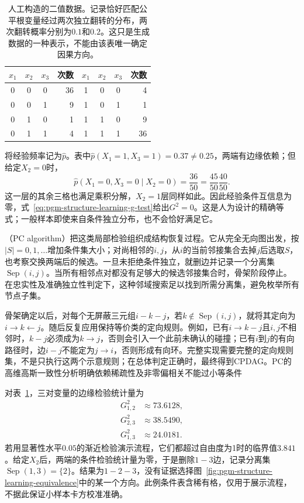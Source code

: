 \begin{table}[htbp]
  \centering
  \begin{tabular}{ccc r@{\qquad}ccc r}
    \toprule
    $x_1$ & $x_2$ & $x_3$ & 次数 & $x_1$ & $x_2$ & $x_3$ & 次数 \\
    \midrule
    0 & 0 & 0 & 36 & 1 & 0 & 0 & 4 \\
    0 & 0 & 1 & 9  & 1 & 0 & 1 & 1 \\
    0 & 1 & 0 & 1  & 1 & 1 & 0 & 9 \\
    0 & 1 & 1 & 4  & 1 & 1 & 1 & 36 \\
    \bottomrule
  \end{tabular}
  \caption{人工构造的二值数据。记录恰好匹配公平根变量经过两次独立翻转的分布，两次翻转概率分别为$0.1$和$0.2$。这只是生成数据的一种表示，不能由该表唯一确定因果方向。}
  \label{tab:pgm-structure-learning-counts}
\end{table}

将经验频率记为$\widehat p$。表中$\widehat p(X_1=1,X_3=1)=0.37\ne0.25$，两端有边缘依赖；但给定$X_2=0$时，
\[
  \widehat p(X_1=0,X_3=0\mid X_2=0)
  =\frac{36}{50}=\frac{45}{50}\frac{40}{50}.
\]
这一层的其余三格也满足乘积分解，$X_2=1$层同样如此。因此经验条件互信息为零，式~\eqref{eq:pgm-structure-learning-g-test}给出$G^2=0$。这是人为设计的精确等式；一般样本即使来自条件独立分布，也不会恰好满足它。

（PC algorithm）把这类局部检验组织成结构恢复过程。它从完全无向图出发，按$|S|=0,1,\ldots$增加条件集大小；对尚相邻的$i,j$，从$i$的当前邻接集合去掉$j$后选取$S$，也考察交换两端后的候选。一旦未拒绝条件独立，就删边并记录一个分离集$\operatorname{Sep}(i,j)$。当所有相邻点对都没有足够大的候选邻接集合时，骨架阶段停止。在忠实性及准确独立性判定下，这种邻域搜索足以找到所需分离集，避免枚举所有节点子集。

骨架确定以后，对每个无屏蔽三元组$i-k-j$，若$k\notin\operatorname{Sep}(i,j)$，就将其定向为$i\to k\leftarrow j$。随后反复应用保持等价类的定向规则。例如，已有$i\to k-j$且$i,j$不相邻时，$k-j$必须成为$k\to j$，否则会引入一个此前未确认的碰撞；已有$i$到$j$的有向路径时，边$i-j$不能定为$j\to i$，否则形成有向环。完整实现需要完整的定向规则集，不是只执行这两个示意规则；在总体判定正确时，最终得到CPDAG。PC的高维高斯一致性分析明确依赖稀疏性及非零偏相关不能过小等条件

对表~\ref{tab:pgm-structure-learning-counts}，三对变量的边缘检验统计量为
\[
  \begin{aligned}
    G^2_{1,2}&\approx73.6128,\\
    G^2_{2,3}&\approx38.5490,\\
    G^2_{1,3}&\approx24.0181.
  \end{aligned}
\]
若用显著性水平$0.05$的渐近检验演示流程，它们都超过自由度为1时的临界值$3.841$。给定$X_2$后，两端的条件检验统计量为零，于是删除$1-3$边，记录分离集$\operatorname{Sep}(1,3)=\{2\}$。结果为$1-2-3$，没有证据选择图~\ref{fig:pgm-structure-learning-equivalence}中的某一个方向。此例条件表含稀有格，仅用于展示流程，不据此保证小样本卡方校准准确。

